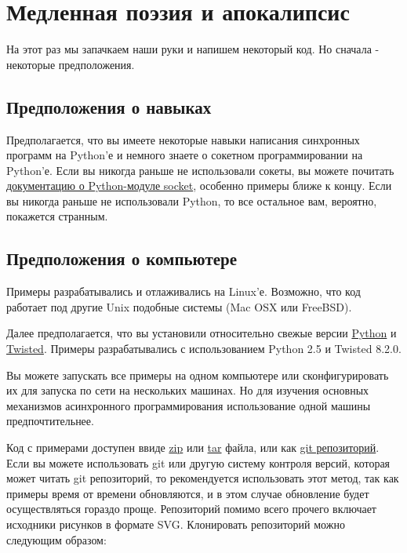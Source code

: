 \section{Медленная поэзия и апокалипсис\label{sec:part2}}


    На этот раз мы запачкаем наши руки и напишем некоторый код. Но сначала - 
некоторые предположения.


\subsection{Предположения о навыках}


    Предполагается, что вы имеете некоторые навыки написания 
синхронных программ на Python'е и немного знаете о 
сокетном программировании на Python'е. Если вы никогда раньше не 
использовали сокеты, вы можете почитать 
\href{http://docs.python.org/library/socket.html#module-socket}{документацию о Python-модуле socket}, 
особенно примеры ближе к концу. Если вы никогда раньше не 
использовали Python, то все остальное вам, вероятно, покажется странным.  


\subsection{Предположения о компьютере}


    Примеры разрабатывались и отлаживались на Linux'е. 
Возможно, что код работает 
под другие Unix подобные системы (Mac OSX или FreeBSD).


Далее предполагается, что вы установили относительно свежые  
версии 
\href{http://python.org/download}{Python} и 
\href{http://twistedmatrix.com/trac/wiki/Downloads}{Twisted}. 
Примеры разрабатывались с использованием 
Python 2.5 и Twisted 8.2.0.


Вы можете запускать все примеры на одном компьютере или 
сконфигурировать их для запуска по сети на 
нескольких машинах. Но для изучения основных механизмов 
асинхронного программирования использование одной 
машины предпочтительнее.


Код с примерами доступен ввиде  
\href{http://github.com/jdavisp3/twisted-intro/zipball/master}{zip} или 
\href{http://github.com/jdavisp3/twisted-intro/tarball/master}{tar} файла, или как 
\href{http://github.com/jdavisp3/twisted-intro/tree/master}{git репозиторий}. 
Если вы можете использовать git 
или другую систему контроля версий, которая может читать 
git репозиторий, то рекомендуется использовать этот метод, 
так как примеры время от времени обновляются, и в этом случае 
обновление будет осуществляться гораздо проще. Репозиторий 
помимо всего прочего  
включает исходники рисунков в формате SVG. 
Клонировать репозиторий можно следующим образом: 

